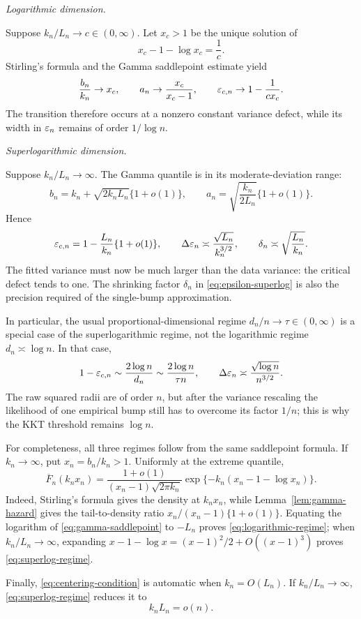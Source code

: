 \medskip
\noindent\emph{Logarithmic dimension.}

Suppose \(k_n/L_n\to c\in(0,\infty)\). Let \(x_c>1\) be the unique
solution of
\begin{equation}
\label{eq:xc}
  x_c-1-\log x_c=\frac1c.
\end{equation}
Stirling's formula and the Gamma saddlepoint estimate yield
\begin{equation}
\label{eq:logarithmic-regime}
  \frac{b_n}{k_n}\to x_c,
  \qquad
  a_n\to\frac{x_c}{x_c-1},
  \qquad
  \varepsilon_{c,n}\to1-\frac1{cx_c}.
\end{equation}
The transition therefore occurs at a nonzero constant variance defect, while
its width in \(\varepsilon_n\) remains of order \(1/\log n\).

\medskip
\noindent\emph{Superlogarithmic dimension.}

Suppose \(k_n/L_n\to\infty\). The Gamma quantile is in its
moderate-deviation range:
\begin{equation}
\label{eq:superlog-regime}
  b_n
  =
  k_n+\sqrt{2k_nL_n}\{1+o(1)\},
  \qquad
  a_n
  =
  \sqrt{\frac{k_n}{2L_n}}\{1+o(1)\}.
\end{equation}
Hence
\begin{equation}
\label{eq:epsilon-superlog}
  \varepsilon_{c,n}
  =
  1-\frac{L_n}{k_n}\{1+o(1)\},
  \qquad
  \Delta\varepsilon_n
  \asymp
  \frac{\sqrt{L_n}}{k_n^{3/2}},
  \qquad
  \delta_n
  \asymp
  \sqrt{\frac{L_n}{k_n}}.
\end{equation}
The fitted variance must now be much larger than the data variance: the
critical defect tends to one. The shrinking factor \(\delta_n\) in
\eqref{eq:epsilon-superlog} is also the precision required of the
single-bump approximation.

In particular, the usual proportional-dimensional regime
\(d_n/n\to\tau\in(0,\infty)\) is a special case of the superlogarithmic
regime, not the logarithmic regime \(d_n\asymp\log n\).  In that case,
\[
  1-\varepsilon_{c,n}
  \sim\frac{2\log n}{d_n}
  \sim\frac{2\log n}{\tau n},
  \qquad
  \Delta\varepsilon_n\asymp\frac{\sqrt{\log n}}{n^{3/2}}.
\]
The raw squared radii are of order \(n\), but after the variance rescaling
the likelihood of one empirical bump still has to overcome its factor
\(1/n\); this is why the KKT threshold remains \(\log n\).

For completeness, all three regimes follow from the same saddlepoint formula.
If \(k_n\to\infty\), put \(x_n=b_n/k_n>1\). Uniformly at the extreme
quantile,
\begin{equation}
\label{eq:gamma-saddlepoint}
  \overline F_n(k_nx_n)
  =
  \frac{1+o(1)}{(x_n-1)\sqrt{2\pi k_n}}
  \exp\{-k_n(x_n-1-\log x_n)\}.
\end{equation}
Indeed, Stirling's formula gives the density at \(k_nx_n\), while
Lemma~\ref{lem:gamma-hazard} gives the tail-to-density ratio
\(x_n/(x_n-1)\{1+o(1)\}\). Equating the logarithm of
\eqref{eq:gamma-saddlepoint} to \(-L_n\) proves
\eqref{eq:logarithmic-regime}; when \(k_n/L_n\to\infty\), expanding
\(x-1-\log x=(x-1)^2/2+O((x-1)^3)\) proves
\eqref{eq:superlog-regime}.

Finally, \eqref{eq:centering-condition} is automatic when \(k_n=O(L_n)\).
If \(k_n/L_n\to\infty\), \eqref{eq:superlog-regime} reduces it to
\begin{equation}
\label{eq:centering-superlog}
  k_nL_n=o(n).
\end{equation}
